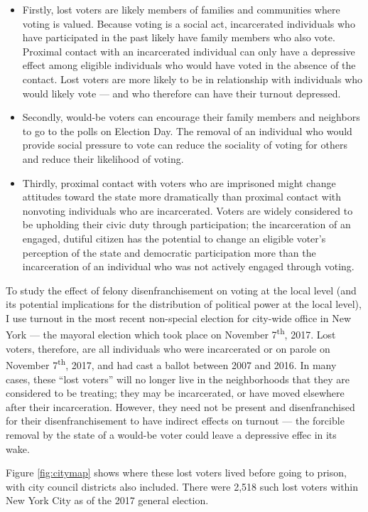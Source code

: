 \documentclass[12pt,]{article}
\begin{document}
\begin{itemize}
\item
  Firstly, lost voters are likely members of families and communities where voting is valued. Because voting is a social act, incarcerated individuals who have participated in the past likely have family members who also vote. Proximal contact with an incarcerated individual can only have a depressive effect among eligible individuals who would have voted in the absence of the contact. Lost voters are more likely to be in relationship with individuals who would likely vote --- and who therefore can have their turnout depressed.
\item
  Secondly, would-be voters can encourage their family members and neighbors to go to the polls on Election Day. The removal of an individual who would provide social pressure to vote can reduce the sociality of voting for others and reduce their likelihood of voting.
\item
  Thirdly, proximal contact with voters who are imprisoned might change attitudes toward the state more dramatically than proximal contact with nonvoting individuals who are incarcerated. Voters are widely considered to be upholding their civic duty through participation; the incarceration of an engaged, dutiful citizen has the potential to change an eligible voter's perception of the state and democratic participation more than the incarceration of an individual who was not actively engaged through voting.
\end{itemize}

To study the effect of felony disenfranchisement on voting at the local level (and its potential implications for the distribution of political power at the local level), I use turnout in the most recent non-special election for city-wide office in New York --- the mayoral election which took place on November 7\textsuperscript{th}, 2017. Lost voters, therefore, are all individuals who were incarcerated or on parole on November 7\textsuperscript{th}, 2017, and had cast a ballot between 2007 and 2016. In many cases, these ``lost voters'' will no longer live in the neighborhoods that they are considered to be treating; they may be incarcerated, or have moved elsewhere after their incarceration. However, they need not be present and disenfranchised for their disenfranchisement to have indirect effects on turnout --- the forcible removal by the state of a would-be voter could leave a depressive effec in its wake.

Figure \ref{fig:citymap} shows where these lost voters lived before going to prison, with city council districts also included. There were 2,518 such lost voters within New York City as of the 2017 general election.
\end{document}
